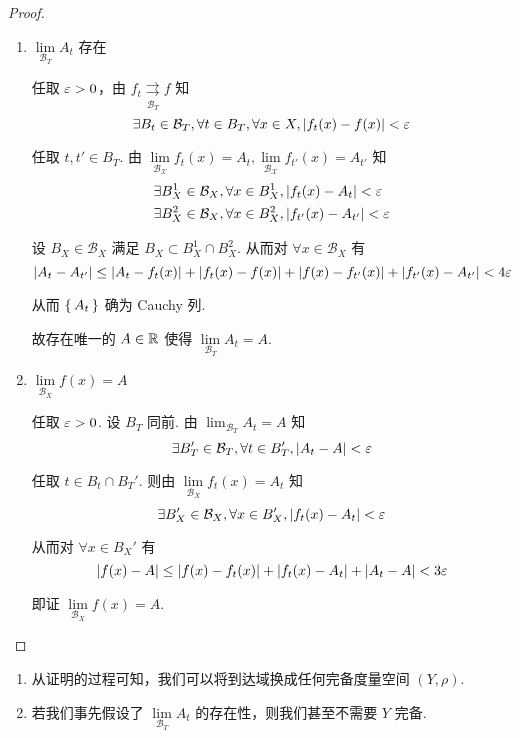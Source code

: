 \begin{proof}
    \begin{enumerate}
        \item $\lim\limits_{\mathcal{B}_T}A_t$ 存在
        
        任取 $\varepsilon>0$，由 $f_t\underset{\mathcal{B}_T}{\rightrightarrows}f$ 知
$$
\exists B_t\in\mathcal{B}_T,\forall t\in B_T,\forall x\in X,\left\lvert{f_t(x)-f(x)}\right\rvert<\varepsilon
$$

        任取 $t,t'\in B_T$. 由 $\lim\limits_{\mathcal{B_X}}f_t(x)=A_t,\lim\limits_{\mathcal{B_X}}f_{t'}(x)=A_{t'}$ 知
$$
\begin{aligned}
    &\exists B_X^1\in\mathcal{B}_X,\forall x\in B_X^1,\left\lvert{f_t(x)-A_t}\right\rvert<\varepsilon\\
    &\exists B_X^2\in\mathcal{B}_X,\forall x\in B_X^2,\left\lvert{f_{t'}(x)-A_{t'}}\right\rvert<\varepsilon
\end{aligned}
$$

        设 $B_X\in\mathcal{B}_X$ 满足 $B_X\subset B_X^1\cap B_X^2$. 从而对 $\forall x\in\mathcal{B}_X$ 有
$$
\left\lvert{A_t-A_{t'}}\right\rvert\le\left\lvert{A_t-f_t(x)}\right\rvert+\left\lvert{f_t(x)-f(x)}\right\rvert+\left\lvert{f(x)-f_{t'}(x)}\right\rvert+\left\lvert{f_{t'}(x)-A_{t'}}\right\rvert<4\varepsilon
$$

        从而 $\set{A_t}$ 确为 Cauchy 列.

        故存在唯一的 $A\in\mathbb{R}$ 使得 $\lim\limits_{\mathcal{B}_T}A_t=A$.

        \item $\lim\limits_{\mathcal{B}_X}f(x)=A$
        
        任取 $\varepsilon>0$. 设 $B_T$ 同前. 由 $\lim_{\mathcal{B}_T}A_t=A$ 知
$$
\exists B_T'\in\mathcal{B}_T,\forall t\in B_T',\left\lvert{A_t-A}\right\rvert<\varepsilon
$$

        任取 $t\in B_t\cap B_T'$. 则由 $\lim\limits_{\mathcal{B}_X}f_t(x)=A_t$ 知
$$
\exists B_X'\in\mathcal{B}_X,\forall x\in B_X',\left\lvert{f_t(x)-A_t}\right\rvert<\varepsilon
$$

        从而对 $\forall x\in B_X'$ 有
$$
\left\lvert{f(x)-A}\right\rvert\le\left\lvert{f(x)-f_t(x)}\right\rvert+\left\lvert{f_t(x)-A_t}\right\rvert+\left\lvert{A_t-A}\right\rvert<3\varepsilon
$$

        即证 $\lim\limits_{\mathcal{B}_X}f(x)=A$.
    \end{enumerate}
\end{proof}

\begin{hint}
    \begin{enumerate}
        \item 从证明的过程可知，我们可以将到达域换成任何完备度量空间 $(Y,\rho)$.
        
        \item 若我们事先假设了 $\lim\limits_{\mathcal{B}_T}A_t$ 的存在性，则我们甚至不需要 $Y$ 完备.
    \end{enumerate}
\end{hint}


